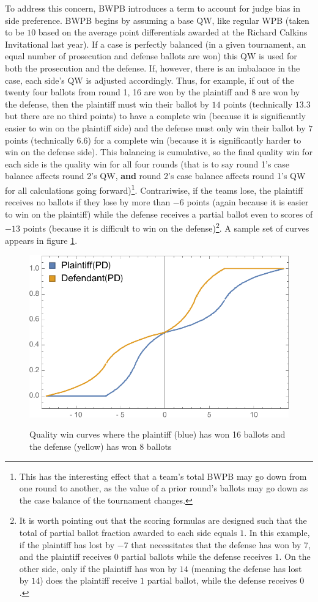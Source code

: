 \documentclass{article}
\begin{document}
To address this concern, BWPB introduces a term to account for judge bias in side preference.  BWPB begins by assuming a base QW, like regular WPB (taken to be $10$ based on the average point differentials awarded at the Richard Calkins Invitational last year).  If a case is perfectly balanced (in a given tournament, an equal number of prosecution and defense ballots are won) this QW is used for both the prosecution and the defense.  If, however, there is an imbalance in the case, each side's QW is adjusted accordingly.  Thus, for example, if out of the twenty four ballots from round 1, 16 are won by the plaintiff and 8 are won by the defense, then the plaintiff must win their ballot by $14$ points (technically $13.3$ but there are no third points) to have a complete win (because it is significantly easier to win on the plaintiff side) and the defense must only win their ballot by $7$ points (technically 6.6) for a complete win (because it is significantly harder to win on the defense side).  This balancing is cumulative, so the final quality win for each side is the quality win for all four rounds (that is to say round 1's case balance affects round 2's QW, \textbf{and} round 2's case balance affects round 1's QW for all calculations going forward)\footnote{This has the interesting effect that a team's total BWPB may go down from one round to another, as the value of a prior round's ballots may go down as the case balance of the tournament changes.}.  Contrariwise, if the teams lose, the plaintiff receives no ballots if they lose by more than $-6$ points (again because it is easier to win on the plaintiff) while the defense receives a partial ballot even to scores of $-13$ points (because it is difficult to win on the defense)\footnote{It is worth pointing out that the scoring formulas are designed such that the total of partial ballot fraction awarded to each side equals $1$.  In this example, if the plaintiff has lost by $-7$ that necessitates that the defense has won by $7$, and the plaintiff receives $0$ partial ballots while the defense receives $1$.  On the other side, only if the plaintiff has won by $14$ (meaning the defense has lost by $14$) does the plaintiff receive $1$ partial ballot, while the defense receives $0$.}.  A sample set of curves appears in figure \ref{balancingCurve}.
\begin{figure}
\begin{center}
\label{balancingCurve}
\includegraphics[width=0.8\linewidth]{BalancingCurve}
\caption{Quality win curves where the plaintiff (blue) has won 16 ballots and the defense (yellow) has won 8 ballots}
\end{center}
\end{figure}
\end{document}
